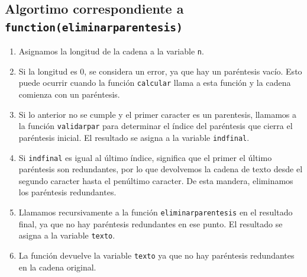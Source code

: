 \documentclass{article}
\begin{document}
\subsection{Algortimo correspondiente a \texttt{function(eliminar\textunderscore parentesis)}}
\begin{enumerate}
    \item Asignamos la longitud de la cadena a la variable \texttt{n}.

    \item Si la longitud es 0, se considera un error, ya que hay un paréntesis vacío. Esto puede ocurrir cuando la función \texttt{calcular} llama a esta función y la cadena comienza con un paréntesis.

    \item Si lo anterior no se cumple y el primer caracter es un parentesis, llamamos a la función \texttt{validar\textunderscore par} para determinar el índice del paréntesis que cierra el paréntesis inicial. El resultado se asigna a la variable \texttt{ind\textunderscore final}.

    \item Si \texttt{ind\textunderscore final} es igual al último índice, significa que el primer  el último paréntesis son redundantes, por lo que devolvemos la cadena de texto desde el segundo caracter hasta el penúltimo caracter. De esta mandera, eliminamos los paréntesis redundantes. 

    \item Llamamos recursivamente a la función \texttt{eliminar\textunderscore parentesis} en el resultado final, ya que no hay paréntesis redundantes en ese punto. El resultado se asigna a la variable \texttt{texto}.

    \item La función devuelve la variable \texttt{texto} ya que no hay paréntesis redundantes en la cadena original.\\
\end{enumerate}
\end{document}
